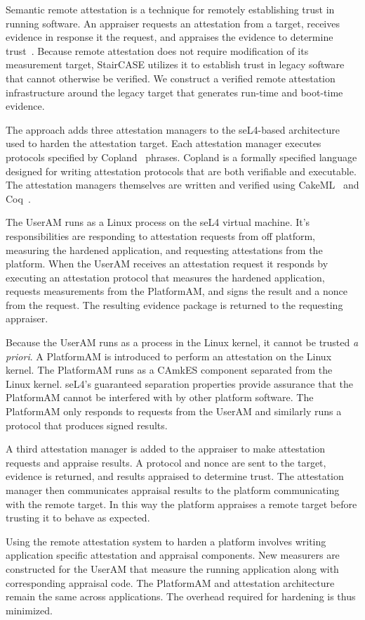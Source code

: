 Semantic remote attestation is a technique for remotely establishing
trust in running software.  An appraiser requests an attestation from
a target, receives evidence in response it the request, and appraises
the evidence to determine
trust~\cite{Haldar:04:Semantic-Remote,Coker::Principles-of-R}. Because
remote attestation does not require modification of its measurement
target, StairCASE utilizes it to establish trust in legacy software
that cannot otherwise be verified.  We construct a verified remote
attestation infrastructure around the legacy target that generates
run-time and boot-time evidence.

The approach adds three attestation managers to the seL4-based
architecture used to harden the attestation target.  Each attestation
manager executes protocols specified by Copland~\cite{Ramsdell:2019aa}
phrases.  Copland is a formally specified language designed for
writing attestation protocols that are both verifiable and executable.
The attestation managers themselves are written and verified using
CakeML~\cite{cakeml} and
Coq~\cite{Bertot:2013aa}.

The UserAM runs as a Linux process on the seL4 virtual machine.  It's
responsibilities are responding to attestation requests from off
platform, measuring the hardened application, and requesting
attestations from the platform.  When the UserAM receives an
attestation request it responds by executing an attestation protocol
that measures the hardened application, requests measurements from the
PlatformAM, and signs the result and a nonce from the request.  The
resulting evidence package is returned to the requesting appraiser.

Because the UserAM runs as a process in the Linux kernel, it cannot be
trusted \emph{a priori}.  A PlatformAM is introduced to perform an
attestation on the Linux kernel.  The PlatformAM runs as a
CAmkES component separated from the Linux kernel.  seL4's guaranteed
separation properties provide assurance that the PlatformAM cannot be
interfered with by other platform software.  The PlatformAM only
responds to requests from the UserAM and similarly runs a protocol
that produces signed results.

A third attestation manager is added to the appraiser to make
attestation requests and appraise results.  A protocol and nonce are
sent to the target, evidence is returned, and results appraised to
determine trust.  The attestation manager then communicates appraisal
results to the platform communicating with the remote target.  In this
way the platform appraises a remote target before trusting it to
behave as expected.

Using the remote attestation system to harden a platform involves
writing application specific attestation and appraisal components.
New measurers are constructed for the UserAM that measure the running
application along with corresponding appraisal code.  The PlatformAM
and attestation architecture remain the same across applications.  The
overhead required for hardening is thus minimized.